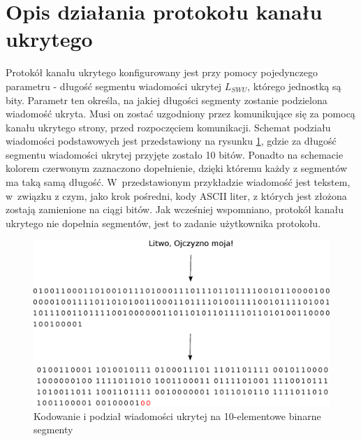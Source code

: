 \documentclass[a4paper, twoside, 12pt]{report}
\begin{document}
    \section{Opis działania protokołu kanału ukrytego} \label{CHANNELDESCRIPTION}
    Protokół kanału ukrytego konfigurowany jest przy pomocy pojedynczego parametru -
    długość segmentu wiadomości ukrytej \( L_{SWU} \), którego jednostką są bity.
    Parametr ten określa, na jakiej długości segmenty zostanie podzielona wiadomość
    ukryta. Musi on zostać uzgodniony przez komunikujące się za pomocą kanału
    ukrytego strony, przed rozpoczęciem komunikacji. Schemat podziału wiadomości
    podstawowych jest przedstawiony na rysunku \ref{SEGMENTATION}, gdzie za długość
    segmentu wiadomości ukrytej przyjęte zostało 10 bitów.
    Ponadto na schemacie kolorem czerwonym zaznaczono dopełnienie, dzięki któremu
    każdy z segmentów ma taką samą długość. W~przedstawionym przykładzie wiadomość
    jest tekstem, w~związku z czym, jako krok pośredni, kody ASCII liter, z których
    jest złożona zostają zamienione na ciągi bitów. Jak wcześniej wspomniano, protokół
    kanału ukrytego nie dopełnia segmentów, jest to zadanie użytkownika protokołu.
        \begin{figure}[h]
                \centering
                \includegraphics[scale=0.8]{podzial_na_segmenty}
                \caption{Kodowanie i  podział wiadomości ukrytej na 10-elementowe binarne segmenty}
                \label{SEGMENTATION}
        \end{figure}
\end{document}
